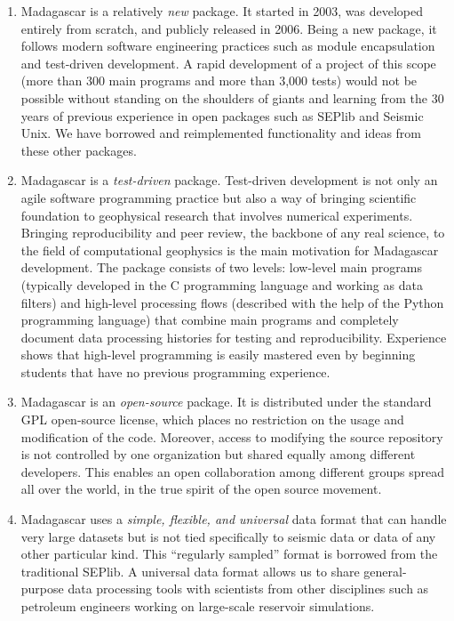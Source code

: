 \begin{enumerate}

\item Madagascar is a relatively \emph{new} package. It started in
2003, was developed entirely from scratch, and publicly released in
2006. Being a new package, it follows modern software engineering
practices such as module encapsulation and test-driven development. A
rapid development of a project of this scope (more than 300 main
programs and more than 3,000 tests) would not be possible without
standing on the shoulders of giants and learning from the 30 years of
previous experience in open packages such as SEPlib and Seismic
Unix. We have borrowed and reimplemented functionality and ideas from
these other packages.

\item Madagascar is a \emph{test-driven} package. Test-driven development is
not only an agile software programming practice but also a way of
bringing scientific foundation to geophysical research that involves
numerical experiments. Bringing reproducibility and peer review, the
backbone of any real science, to the field of computational geophysics
is the main motivation for Madagascar development. The package consists of
two levels: low-level main programs (typically developed in the C
programming language and working as data filters) and high-level
processing flows (described with the help of the Python programming
language) that combine main programs and completely document data
processing histories for testing and reproducibility. Experience
shows that high-level programming is easily mastered even by beginning
students that have no previous programming experience.

\item Madagascar is an \emph{open-source} package. It is distributed
under the standard GPL open-source license, which places no
restriction on the usage and modification of the code. Moreover,
access to modifying the source repository is not controlled by one
organization but shared equally among different developers. This
enables an open collaboration among different groups spread all over
the world, in the true spirit of the open source movement.

\item Madagascar uses a \emph{simple, flexible, and universal} data
format that can handle very large datasets but is not tied
specifically to seismic data or data of any other particular
kind. This ``regularly sampled'' format is borrowed from the
traditional SEPlib. A universal data format allows us to share
general-purpose data processing tools with scientists from other
disciplines such as petroleum engineers working on large-scale
reservoir simulations.

\end{enumerate}

